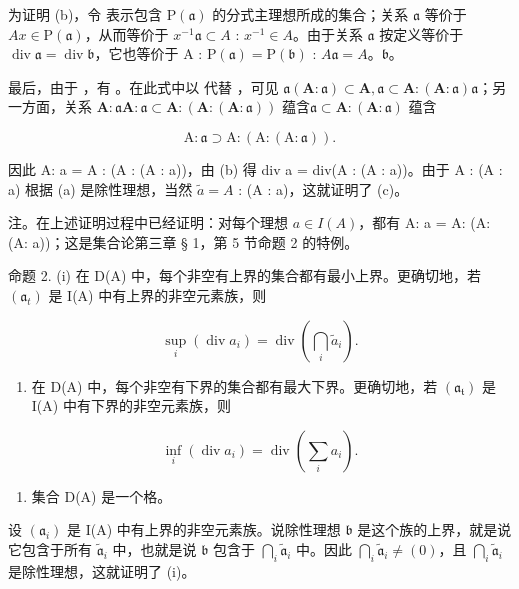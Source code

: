 为证明 (b)，令  表示包含 \(\mathrm{P}(\mathfrak{a})\) 的分式主理想所成的集合；关系 \(\mathfrak{a}\) 等价于 \(Ax \in \mathrm{P}(\mathfrak{a})\)，从而等价于 \(x^{-1}\mathfrak{a} \subset A\) : \(x^{-1} \in A\)。由于关系 \(\mathfrak{a}\) 按定义等价于 \(\operatorname{div} \mathfrak{a} = \operatorname{div} \mathfrak{b}\)，它也等价于 A : \(\mathrm{P}(\mathfrak{a}) = \mathrm{P}(\mathfrak{b})\) : \(A\)\(\mathfrak{a} = A\)。\(\mathfrak{b}\)。

最后，由于 ，有 。在此式中以  代替 ，可见 \(\mathfrak{a}(\mathbf{A}:\mathfrak{a})\subset \mathbf{A},\mathfrak{a}\subset \mathbf{A}:(\mathbf{A}:\mathfrak{a})\)\(\mathfrak{a}\)；另一方面，关系 \(\mathbf{A}:\mathfrak{a}\)\(\mathbf{A}:\mathfrak{a}\subset \mathbf{A}:(\mathbf{A}:(\mathbf{A}:\mathfrak{a}))\) 蕴含\(\mathfrak{a}\subset \mathbf{A}:(\mathbf{A}:\mathfrak{a})\) 蕴含

\[
\mathrm{A}: \mathfrak {a} \supset \mathrm{A}: (\mathrm{A}: (\mathrm{A}: \mathfrak {a})).
\]

因此 A: a = A : (A : (A : a))，由 (b) 得 div a = div(A : (A : a))。由于 A : (A : a) 根据 (a) 是除性理想，当然 \(\tilde{a} = A\) : (A : a)，这就证明了 (c)。

注。在上述证明过程中已经证明：对每个理想 \(a \in I(A)\)，都有 A: a = A: (A: (A: a))；这是集合论第三章 § 1，第 5 节命题 2 的特例。

命题 2. (i) 在 D(A) 中，每个非空有上界的集合都有最小上界。更确切地，若 \((\mathfrak{a}_t)\) 是 I(A) 中有上界的非空元素族，则

\[
\sup _ {i} (\operatorname{div} a _ {i}) = \operatorname{div} \left(\bigcap_ {i} \tilde {a} _ {i}\right).
\]

\begin{enumerate}
\def\labelenumi{(\roman{enumi})}
\setcounter{enumi}{1}
\tightlist
\item
在 D(A) 中，每个非空有下界的集合都有最大下界。更确切地，若 \((\mathfrak{a}_{\mathfrak{t}})\) 是 I(A) 中有下界的非空元素族，则
\end{enumerate}

\[
\inf _ {i} (\operatorname{div} a _ {i}) = \operatorname{div} \left(\sum_ {i} a _ {i}\right).
\]

\begin{enumerate}
\def\labelenumi{(\roman{enumi})}
\setcounter{enumi}{2}
\tightlist
\item
集合 D(A) 是一个格。
\end{enumerate}

设 \((\mathfrak{a}_i)\) 是 I(A) 中有上界的非空元素族。说除性理想 \(\mathfrak{b}\) 是这个族的上界，就是说它包含于所有 \(\tilde{\mathfrak{a}}_i\) 中，也就是说 \(\mathfrak{b}\) 包含于 \(\bigcap_{i} \tilde{\mathfrak{a}}_i\) 中。因此 \(\bigcap_{i} \tilde{\mathfrak{a}}_i \neq (0)\)，且 \(\bigcap_{i} \tilde{\mathfrak{a}}_i\) 是除性理想，这就证明了 (i)。

